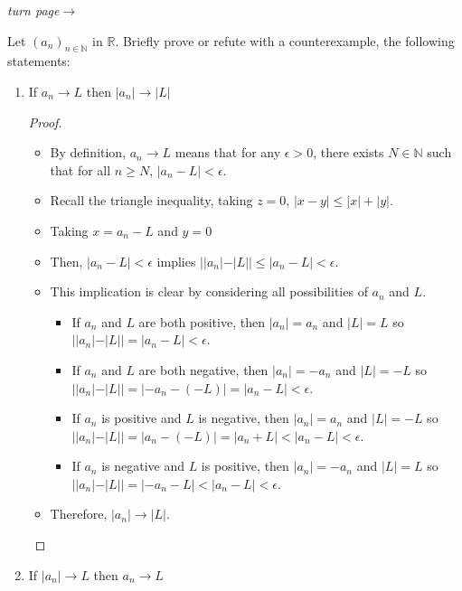 \documentclass[10pt]{article}
\newcommand{\N}{\mathbb{N}}
\newcommand{\R}{\mathbb{R}}
\newenvironment{problem}[2][Problem]{\begin{trivlist}
\item[\hskip \labelsep {\bfseries #1}\hskip \labelsep {\bfseries #2.}]}{\end{trivlist}}
\begin{document}
\vfill\hfill \emph{turn page}$ \longrightarrow $
\newpage

\begin{problem}{4}
	Let $ (a_n)_{n\in\N} $ in $ \R $. Briefly prove or refute with a counterexample, the following statements:
	\begin{enumerate}
		\item If $ a_n \to L $ then $ |a_n|\to |L| $
            \begin{proof}
                \hfill
                \begin{itemize}
                    \item By definition, $a_n \to L$ means that for any $\epsilon > 0$, there exists $N \in \N$ such that for all $n \geq N$, $|a_n - L| < \epsilon$.
                    \item Recall the triangle inequality, taking $z = 0$, $|x - y| \leq |x| + |y|$.
                    \item Taking $x = a_n - L$ and $y = 0$
                    \item Then, $|a_n - L| < \epsilon$ implies $||a_n| - |L|| \leq |a_n - L| < \epsilon$.
                    \item This implication is clear by considering all possibilities of $a_n$ and $L$.
                    \begin{itemize}
                        \item If $a_n$ and $L$ are both positive, then $|a_n| = a_n$ and $|L| = L$
                            so $||a_n| - |L|| = |a_n - L| < \epsilon$.
                        \item If $a_n$ and $L$ are both negative, then $|a_n| = -a_n$ and $|L| = -L$
                            so $||a_n| - |L|| = |-a_n - (-L)| = |a_n - L| < \epsilon$.
                        \item If $a_n$ is positive and $L$ is negative, then $|a_n| = a_n$ and $|L| = -L$
                        so $||a_n| - |L|| = |a_n - (-L)| = |a_n + L| < |a_n - L| < \epsilon$.
                    \item If $a_n$ is negative and $L$ is positive, then $|a_n| = -a_n$ and $|L| = L$
                        so $||a_n| - |L|| = |-a_n - L| < |a_n - L| < \epsilon$.
                    \end{itemize}
                    \item Therefore, $|a_n| \to |L|$.
                \end{itemize}
            \end{proof}
		\item If $ |a_n|\to L $ then $ a_n \to L $

\end{enumerate}
\end{problem}
\end{document}
